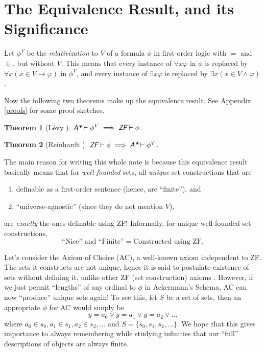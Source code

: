 \documentclass{article}
\newtheorem{theorem}{Theorem}[section]
\begin{document}
\section{The Equivalence Result, and its Significance}
Let $\phi^V$ be the \textit{relativization} to $V$ of a formula $\phi$ in first-order logic with $=$ and $\in$, but without $V$. This means that every instance of $\forall x \varphi$ in $\phi$ is replaced by $\forall x (x \in V \rightarrow \varphi)$ in $\phi^V$, and every instance of $\exists x \varphi$ is replaced by $\exists x (x \in V \wedge \varphi)$.

Now the following two theorems make up the equivalence result. See Appendix \ref{proofs} for some proof sketches.

\begin{theorem}[Lévy \cite{levy}]\label{levy-thm}
	$\emph{\textsf{A*}}\vdash\phi^V \implies \emph{\textsf{ZF}}\vdash\phi$.
\end{theorem}
\begin{theorem}[Reinhardt \cite{reinhardt}]\label{reinhardt-thm}
	$\emph{\textsf{ZF}}\vdash\phi \implies \emph{\textsf{A*}}\vdash\phi^V$.
\end{theorem}

\noindent The main reason for writing this whole note is because this equivalence result basically means that for \textit{well-founded} sets, all \textit{unique} set constructions that are
\begin{enumerate}
	\item definable as a first-order sentence (hence, are ``finite''), and
	\item ``universe-agnostic'' (since they do not mention $V$),
\end{enumerate}
are \textit{exactly} the ones definable using ZF! Informally, for unique well-founded set constructions, $$\text{``Nice'' and ``Finite''} = \text{Constructed using ZF}.$$

Let's consider the Axiom of Choice (AC), a well-known axiom independent to ZF. The sets it constructs are not unique, hence it is said to postulate existence of sets without defining it, unlike other ZF (set construction) axioms \cite[Chapter 5]{jech}. However, if we just permit ``lengths'' of any ordinal to $\phi$ in Ackermann's Schema, AC can now ``produce'' unique sets again! To see this, let $S$ be a set of sets, then an appropriate $\phi$ for AC would simply be $$y = a_0 \vee y = a_1 \vee y = a_2 \vee \ldots$$ where $a_0 \in s_0, a_1 \in s_1, a_2 \in s_2, \ldots$ and $S=\{s_0, s_1, s_2, \ldots\}$. We hope that this gives importance to always remembering while studying infinities that our ``full'' descriptions of objects are always finite.
\end{document}
